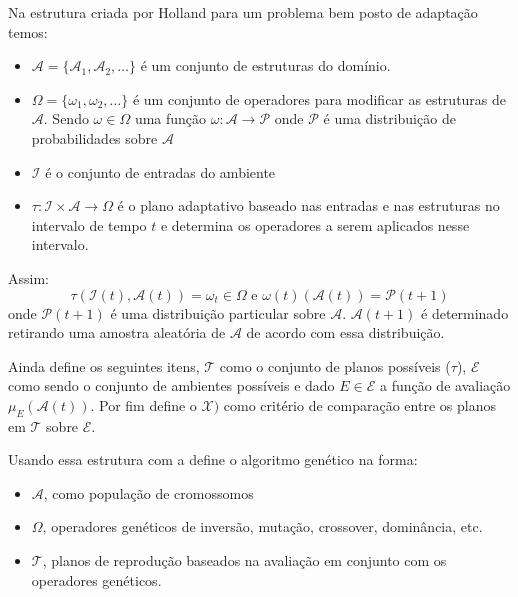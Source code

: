Na estrutura criada por Holland para um problema bem posto de adaptação temos:
\begin{itemize}
	\item \( \mathscr{A} = \{ \mathcal{A}_1, \mathcal{A}_2, \ldots \} \) é um conjunto de estruturas do domínio.
	\item \( \Omega = \{ \omega_1, \omega_2, \ldots \} \) é um conjunto de operadores para modificar as estruturas de \( \mathscr{A} \).  Sendo \( \omega \in \Omega \) uma função \(\omega : \mathscr{A} \to \mathcal{P} \) onde \(\mathcal{P}\) é uma distribuição de probabilidades sobre \(\mathscr{A}\)
	\item \( \mathcal{I}\) é o conjunto de entradas do ambiente
	\item \( \tau : \mathcal{I} \times \mathscr{A} \to \Omega\) é o plano adaptativo baseado nas entradas e nas estruturas no intervalo de tempo \(t\) e determina os operadores a serem aplicados nesse intervalo.
\end{itemize}
Assim: 
\[\tau(\mathcal{I}(t), \mathscr{A}(t)) = \omega_t \in \Omega \text{ e } \omega(t)(\mathscr{A}(t)) = \mathcal{P}(t + 1)\]
onde \(\mathcal{P}(t + 1) \) é uma distribuição particular sobre \( \mathscr{A} \). \( \mathscr{A}(t+1) \) é determinado retirando uma amostra aleatória de \( \mathscr{A} \) de acordo com essa distribuição. \cite{Holland1992}

Ainda define os seguintes itens, \( \mathcal{T} \) como o conjunto de planos possíveis (\(\tau\)), \(\mathcal{E}\) como sendo o conjunto de ambientes possíveis e dado \( E \in \mathcal{E} \) a função de avaliação \(\mu_E(\mathscr{A}(t))\). Por fim define o \(\mathcal{X})\) como critério de comparação entre os planos em \( \mathcal{T} \) sobre \(\mathcal{E}\).

Usando essa estrutura com a define o algoritmo genético na forma:
\begin{itemize}
	\item \( \mathscr{A} \), como população de cromossomos
	\item \( \Omega \), operadores genéticos de inversão, mutação, crossover, dominância, etc.
	\item \( \mathcal{T} \), planos de reprodução baseados na avaliação em conjunto com os operadores genéticos.
\end{itemize}

